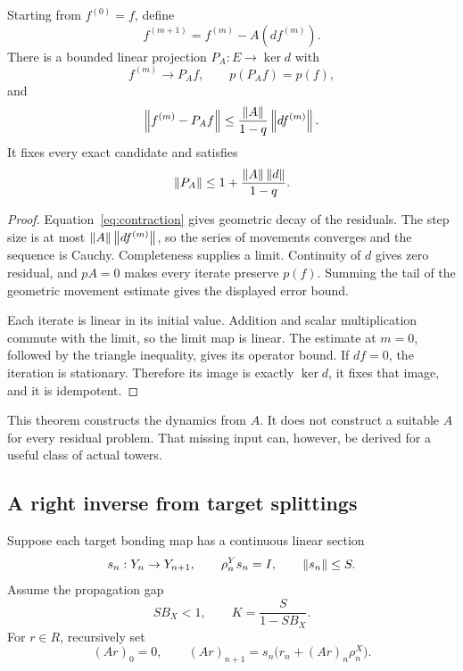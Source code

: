 \begin{theorem}\label{KS19}
Starting from \(f^{(0)}=f\), define
\[
 f^{(m+1)}=f^{(m)}-A(df^{(m)}).
\]
There is a bounded linear projection \(P_A:E\to\ker d\) with
\[
 f^{(m)}\longrightarrow P_Af,\qquad p(P_Af)=p(f),
\]
and
\[
 \left\lVert f^{(m)}-P_Af\right\rVert
 \le\frac{\left\lVert A\right\rVert}{1-q}\left\lVert df^{(m)}\right\rVert.
\]
It fixes every exact candidate and satisfies
\[
 \left\lVert P_A\right\rVert\le1+\frac{\left\lVert A\right\rVert\left\lVert d\right\rVert}{1-q}.
\]
\end{theorem}
\begin{proof}
Equation~\eqref{eq:contraction} gives geometric decay of the residuals. The step size is at most \(\left\lVert A\right\rVert\left\lVert df^{(m)}\right\rVert\), so the series of movements converges and the sequence is Cauchy. Completeness supplies a limit. Continuity of \(d\) gives zero residual, and \(pA=0\) makes every iterate preserve \(p(f)\). Summing the tail of the geometric movement estimate gives the displayed error bound.

Each iterate is linear in its initial value. Addition and scalar multiplication commute with the limit, so the limit map is linear. The estimate at \(m=0\), followed by the triangle inequality, gives its operator bound. If \(df=0\), the iteration is stationary. Therefore its image is exactly \(\ker d\), it fixes that image, and it is idempotent.
\end{proof}
This theorem constructs the dynamics from \(A\). It does not construct a suitable \(A\) for every residual problem. That missing input can, however, be derived for a useful class of actual towers.

\subsection{A right inverse from target splittings}
Suppose each target bonding map has a continuous linear section
\[
 s_n:Y_n\to Y_{n+1},\qquad \rho^Y_ns_n=I,\qquad \left\lVert s_n\right\rVert\le S.
\]
Assume the propagation gap
\begin{equation}\label{eq:splitgap}
 SB_X<1,\qquad K=\frac{S}{1-SB_X}.
\end{equation}
For \(r\in R\), recursively set
\begin{equation}\label{eq:greenrecurrence}
 (Ar)_0=0,\qquad
 (Ar)_{n+1}=s_n\bigl(r_n+(Ar)_n\rho^X_n\bigr).
\end{equation}

